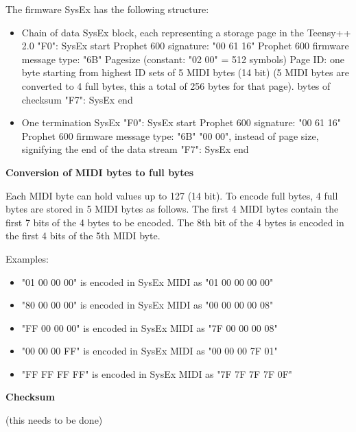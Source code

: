 The firmware SysEx has the following structure:

\begin{itemize}
  \item Chain of data SysEx block, each representing a storage page in the Teensy++ 2.0
  \subitem "F0": SysEx start
  \subitem Prophet 600 signature: "00 61 16"
  \subitem Prophet 600 firmware message type: "6B"
  \subitem Pagesize (constant: "02 00" = 512 symbols)
  \subitem Page ID: one byte starting from highest ID
   sets of 5 MIDI bytes (14 bit) (5 MIDI bytes are converted to 4 full bytes, this a total of 256 bytes for that page).
   bytes of checksum
  \subitem "F7": SysEx end
  \item One termination SysEx
  \subitem "F0": SysEx start
  \subitem Prophet 600 signature: "00 61 16"
  \subitem Prophet 600 firmware message type: "6B"
  \subitem "00 00", instead of page size, signifying the end of the data stream
  \subitem "F7": SysEx end  
\end{itemize}


\textbf{Conversion of MIDI bytes to full bytes}

Each MIDI byte can hold values up to 127 (14 bit). To encode full bytes, 4 full bytes are stored in 5 MIDI bytes as follows. The first 4 MIDI bytes contain the first 7 bits of the 4 bytes to be encoded. The 8th bit of the 4 bytes is encoded in the first 4 bits of the 5th MIDI byte.   

Examples:

\begin{itemize}
  \item "01 00 00 00" is encoded in SysEx MIDI as "01 00 00 00 00"
  \item "80 00 00 00" is encoded in SysEx MIDI as "00 00 00 00 08"
  \item "FF 00 00 00" is encoded in SysEx MIDI as "7F 00 00 00 08"
  \item "00 00 00 FF" is encoded in SysEx MIDI as "00 00 00 7F 01"
  \item "FF FF FF FF" is encoded in SysEx MIDI as "7F 7F 7F 7F 0F"
\end{itemize}

\textbf{Checksum}

(this needs to be done)
